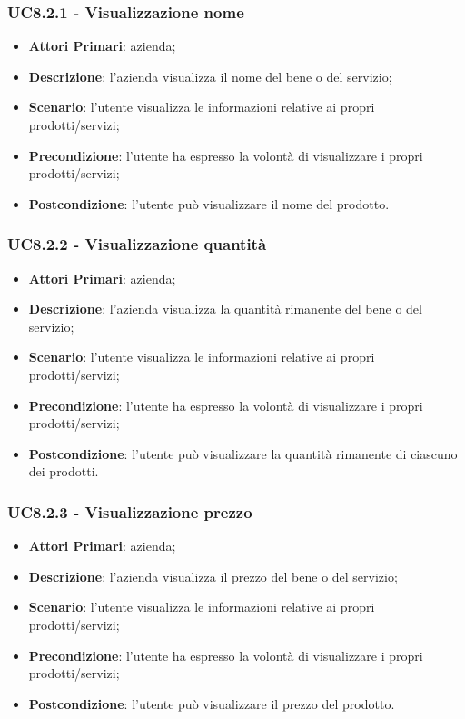 \subsubsection{UC8.2.1 - Visualizzazione nome}
\begin{itemize}
	\item \textbf{Attori Primari}: azienda;
	\item \textbf{Descrizione}: l'azienda visualizza il nome del bene o del servizio;
	\item \textbf{Scenario}: l'utente visualizza le informazioni relative ai propri prodotti/servizi;
	\item \textbf{Precondizione}: l'utente ha espresso la volontà di visualizzare i propri prodotti/servizi;
	\item \textbf{Postcondizione}: l'utente può visualizzare il nome del prodotto.
\end{itemize}
\subsubsection{UC8.2.2 - Visualizzazione quantità}
\begin{itemize}
	\item \textbf{Attori Primari}: azienda;
	\item \textbf{Descrizione}: l'azienda visualizza la quantità rimanente del bene o del servizio;
	\item \textbf{Scenario}: l'utente visualizza le informazioni relative ai propri prodotti/servizi;
	\item \textbf{Precondizione}: l'utente ha espresso la volontà di visualizzare i propri prodotti/servizi;
	\item \textbf{Postcondizione}: l'utente può visualizzare la quantità rimanente di ciascuno dei prodotti.
\end{itemize}
\subsubsection{UC8.2.3 - Visualizzazione prezzo}
\begin{itemize}
	\item \textbf{Attori Primari}: azienda;
	\item \textbf{Descrizione}: l'azienda visualizza il prezzo del bene o del servizio;
	\item \textbf{Scenario}: l'utente visualizza le informazioni relative ai propri prodotti/servizi;
	\item \textbf{Precondizione}: l'utente ha espresso la volontà di visualizzare i propri prodotti/servizi;
	\item \textbf{Postcondizione}: l'utente può visualizzare il prezzo del prodotto.
\end{itemize}

